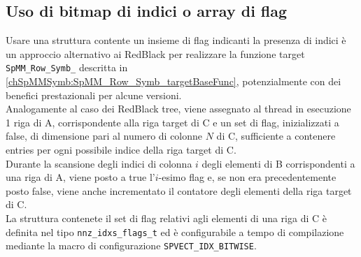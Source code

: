 \subsection{Uso di bitmap di indici o array di flag} \label{chSpMMSymb:structFlagSet}
Usare una struttura contente un insieme di flag indicanti
la presenza di indici è un approccio alternativo ai RedBlack
per realizzare la funzione target \verb|SpMM_Row_Symb_| descritta in \ref{chSpMMSymb:SpMM_Row_Symb_targetBaseFunc}, 
potenzialmente con dei benefici prestazionali per alcune versioni.\\
Analogamente al caso dei RedBlack tree, viene assegnato al thread in esecuzione 
1 riga di A, corrispondente alla riga target di C e 
un set di flag, inizializzati a false, di dimensione pari al numero di colonne $N$ di C,
sufficiente a contenere entries per ogni possibile indice della riga target di C.\\
Durante la scansione degli indici di colonna $i$ degli elementi \nnz di B corrispondenti a una riga di A, 
viene posto a true l'$i$-esimo flag e, se non era precedentemente posto false, viene anche incrementato il 
contatore degli elementi \nnz della riga target di C.\\
La struttura contenete il set di flag relativi agli elementi \nnz di una riga di C 
è definita nel tipo \verb|nnz_idxs_flags_t| ed è 
configurabile a tempo di compilazione mediante la macro di configurazione \verb|SPVECT_IDX_BITWISE|.
